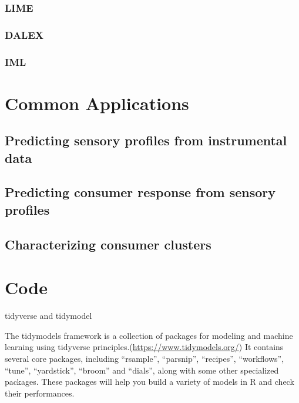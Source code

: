 \documentclass[
]{book}
\begin{document}
\hypertarget{lime}{%
\subsubsection{LIME}\label{lime}}

\hypertarget{dalex}{%
\subsubsection{DALEX}\label{dalex}}

\hypertarget{iml}{%
\subsubsection{IML}\label{iml}}

\hypertarget{common-applications}{%
\section{Common Applications}\label{common-applications}}

\hypertarget{predicting-sensory-profiles-from-instrumental-data}{%
\subsection{Predicting sensory profiles from instrumental data}\label{predicting-sensory-profiles-from-instrumental-data}}

\hypertarget{predicting-consumer-response-from-sensory-profiles}{%
\subsection{Predicting consumer response from sensory profiles}\label{predicting-consumer-response-from-sensory-profiles}}

\hypertarget{characterizing-consumer-clusters}{%
\subsection{Characterizing consumer clusters}\label{characterizing-consumer-clusters}}

\hypertarget{code}{%
\section{Code}\label{code}}

tidyverse and tidymodel

The tidymodels framework is a collection of packages for modeling and machine learning using tidyverse principles.(\url{https://www.tidymodels.org/}) It contains several core packages, including ``rsample'', ``parsnip'', ``recipes'', ``workflows'', ``tune'', ``yardstick'', ``broom'' and ``dials'', along with some other specialized packages. These packages will help you build a variety of models in R and check their performances.
\end{document}
